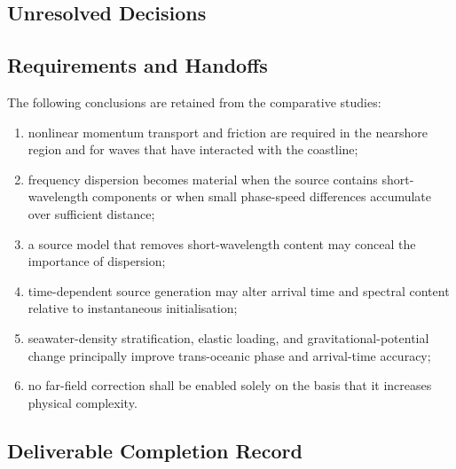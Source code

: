 
\subsection{Unresolved Decisions}
\label{sec:res-mod-eqs-unresolved-decisions}


\subsection{Requirements and Handoffs}
\label{sec:res-mod-eqs-requirements}


The following conclusions are retained from the comparative studies:

\begin{enumerate}
  \item nonlinear momentum transport and friction are required in
    the nearshore region and for waves that have interacted with
    the coastline;
  \item frequency dispersion becomes material when the source
    contains short-wavelength components or when small
    phase-speed differences accumulate over sufficient distance;
  \item a source model that removes short-wavelength content may
    conceal the importance of dispersion;
  \item time-dependent source generation may alter arrival time and
    spectral content relative to instantaneous initialisation;
  \item seawater-density stratification, elastic loading, and
    gravitational-potential change principally improve
    trans-oceanic phase and arrival-time accuracy;
  \item no far-field correction shall be enabled solely on the basis
    that it increases physical complexity.
\end{enumerate}

\subsection{Deliverable Completion Record}
\label{sec:res-mod-eqs-completion-record}

%
%
%
